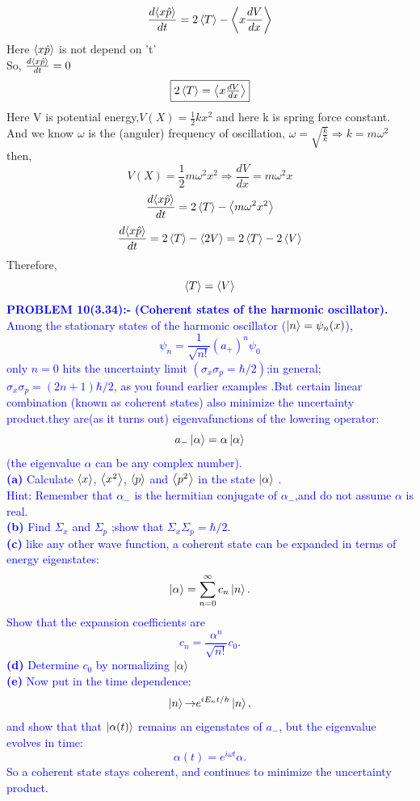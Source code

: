          $$\frac{d{\Braket{x\hat{p}}}}{dt}=2\Braket{T}-\Braket{x\frac{dV}{dx}}$$
       Here $\Braket{x\hat{p}}$ is not depend on 't'\\ So, $\frac{d{\Braket{x\hat{p}}}}{dt}=0$
       \[\boxed{$$ 2\Braket{T}=\Braket{x\frac{dV}{dx}}$$}\]
       Here V is potential energy,$V(X)=\frac{1}{2}{kx^2}$ and here k is spring force constant.\\
       And we know $\omega$ is the (anguler) frequency of oscillation, $\omega=\sqrt{\frac{k}{k}}\Rightarrow k=m{\omega}^2$\\
       then,$$V(X)=\frac{1}{2}m{\omega}^2{x^2} \Rightarrow \frac{dV}{dx} =m{\omega}^2{x}$$
       $$\frac{d{\Braket{x\hat{p}}}}{dt}=2\Braket{T}-\Braket{m{\omega}^2{x}^2}$$
       $$\frac{d{\Braket{x\hat{p}}}}{dt}=2\Braket{T}-\Braket{2V}=2\Braket{T}-2\Braket{V}$$
       Therefore, $$\Braket{T}=\Braket{V}$$
 \newpage
 \textcolor{blue}{ \textbf{PROBLEM 10(3.34):-}  \textbf{(Coherent states of the harmonic oscillator).} \\Among the stationary states of the harmonic oscillator ($\ket{n}={\psi}_{n}(x)$),
 $${\psi}_{n}=\frac{1}{\sqrt{n!}}(a_{+})^n{{\psi}_{0}}$$
 only $n=0$ hits the uncertainty limit $({\sigma}_{x} {\sigma}_{p}=\hbar/2)$;in general;${\sigma}_{x} {\sigma}_{p}=(2n+1)\hbar/2$, as you found earlier examples .But certain linear combination (known as coherent states) also minimize the uncertainty product.they are(as it turns out) eigenvafunctions of the lowering operator:$$a_{-}\ket{\alpha}=\alpha\ket{\alpha}$$ (the eigenvalue $\alpha$ can be any complex number).\\
 \textbf{(a)} Calculate $\Braket{x}$, $\Braket{x^2}$, $\Braket{p}$ and $\Braket{p^2}$ in the state $\ket{\alpha}$ .\\Hint: Remember that ${\alpha}_{-}$ is the hermitian conjugate  of ${\alpha}_{-}$,and do not assume $\alpha$ is real.\\
 \textbf{(b)} Find ${\Sigma}_{x}$ and ${\Sigma}_{p}$ ;show that ${\Sigma}_{x}{\Sigma}_{p}=\hbar/2.$\\
 \textbf{(c)} like any other wave function, a coherent state can be expanded in terms of energy eigenstates:
 $$\ket{\alpha}=\sum_{n=0}^{\infty} c_{n}\ket{n}.$$ 
 Show that the expansion coefficients are 
 $$c_{n}=\frac{{\alpha}^n}{\sqrt{n!}}c_{0}.$$
 \textbf{(d)} Determine $c_{0}$ by normalizing $\ket{\alpha}$\\
 \textbf{(e)} Now put in the time dependence:
 $$\ket{n}{\rightarrow} e^{iE_{n}t/h}\ket{n},$$
 and show that that $\ket{\alpha{(t)}}$ remains an eigenstates of $a_{-}$, but the eigenvalue evolves in time:
 $$\alpha{(t)}=e^{i{\omega} {t}}{\alpha}.$$
 So a coherent state stays coherent, and continues to minimize the uncertainty product.}\\
